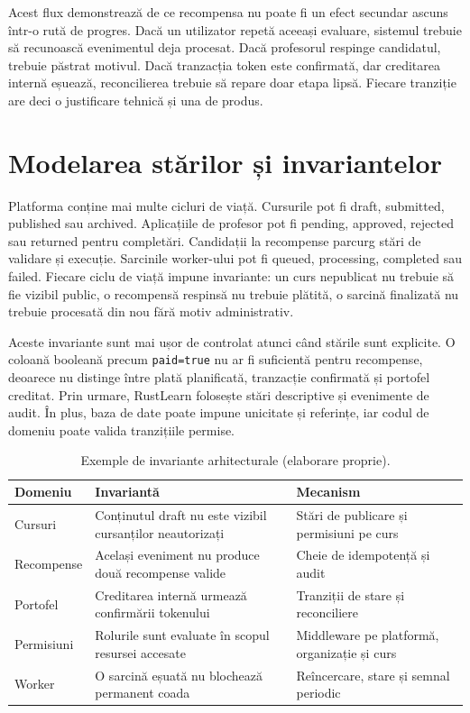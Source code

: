 Acest flux demonstrează de ce recompensa nu poate fi un efect secundar ascuns într-o rută de progres. Dacă un utilizator repetă aceeași evaluare, sistemul trebuie să recunoască evenimentul deja procesat. Dacă profesorul respinge candidatul, trebuie păstrat motivul. Dacă tranzacția token este confirmată, dar creditarea internă eșuează, reconcilierea trebuie să repare doar etapa lipsă. Fiecare tranziție are deci o justificare tehnică și una de produs.

\section{Modelarea stărilor și invariantelor}
Platforma conține mai multe cicluri de viață. Cursurile pot fi draft, submitted, published sau archived. Aplicațiile de profesor pot fi pending, approved, rejected sau returned pentru completări. Candidații la recompense parcurg stări de validare și execuție. Sarcinile worker-ului pot fi queued, processing, completed sau failed. Fiecare ciclu de viață impune invariante: un curs nepublicat nu trebuie să fie vizibil public, o recompensă respinsă nu trebuie plătită, o sarcină finalizată nu trebuie procesată din nou fără motiv administrativ.

Aceste invariante sunt mai ușor de controlat atunci când stările sunt explicite. O coloană booleană precum \texttt{paid=true} nu ar fi suficientă pentru recompense, deoarece nu distinge între plată planificată, tranzacție confirmată și portofel creditat. Prin urmare, RustLearn folosește stări descriptive și evenimente de audit. În plus, baza de date poate impune unicitate și referințe, iar codul de domeniu poate valida tranzițiile permise.

\begin{table}[H]
    \centering
    \caption{Exemple de invariante arhitecturale (elaborare proprie).}
    \label{tab:invariante}
    \begin{tabular}{P{3.8cm}P{5.4cm}P{4.5cm}}
        \toprule
        Domeniu & Invariantă & Mecanism \\
        \midrule
        Cursuri & Conținutul draft nu este vizibil cursanților neautorizați & Stări de publicare și permisiuni pe curs \\
        Recompense & Același eveniment nu produce două recompense valide & Cheie de idempotență și audit \\
        Portofel & Creditarea internă urmează confirmării tokenului & Tranziții de stare și reconciliere \\
        Permisiuni & Rolurile sunt evaluate în scopul resursei accesate & Middleware pe platformă, organizație și curs \\
        Worker & O sarcină eșuată nu blochează permanent coada & Reîncercare, stare și semnal periodic \\
        \bottomrule
    \end{tabular}
\end{table}

